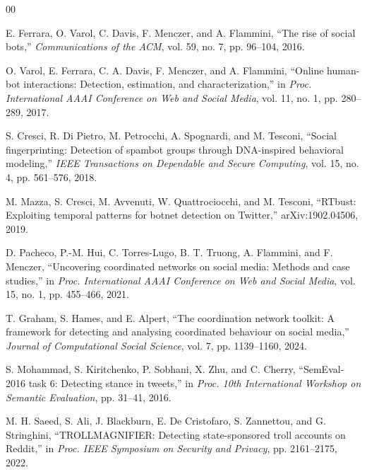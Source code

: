 \documentclass[conference]{IEEEtran}
\begin{document}
\begin{thebibliography}{00}

E. Ferrara, O. Varol, C. Davis, F. Menczer, and A. Flammini, ``The rise of
social bots,'' \emph{Communications of the ACM}, vol. 59, no. 7, pp. 96--104,
2016.

O. Varol, E. Ferrara, C. A. Davis, F. Menczer, and A. Flammini, ``Online
human-bot interactions: Detection, estimation, and characterization,'' in
\emph{Proc. International AAAI Conference on Web and Social Media}, vol. 11,
no. 1, pp. 280--289, 2017.

S. Cresci, R. Di Pietro, M. Petrocchi, A. Spognardi, and M. Tesconi, ``Social
fingerprinting: Detection of spambot groups through DNA-inspired behavioral
modeling,'' \emph{IEEE Transactions on Dependable and Secure Computing},
vol. 15, no. 4, pp. 561--576, 2018.

M. Mazza, S. Cresci, M. Avvenuti, W. Quattrociocchi, and M. Tesconi,
``RTbust: Exploiting temporal patterns for botnet detection on Twitter,''
arXiv:1902.04506, 2019.

D. Pacheco, P.-M. Hui, C. Torres-Lugo, B. T. Truong, A. Flammini, and
F. Menczer, ``Uncovering coordinated networks on social media: Methods and
case studies,'' in \emph{Proc. International AAAI Conference on Web and Social
Media}, vol. 15, no. 1, pp. 455--466, 2021.

T. Graham, S. Hames, and E. Alpert, ``The coordination network toolkit: A
framework for detecting and analysing coordinated behaviour on social media,''
\emph{Journal of Computational Social Science}, vol. 7, pp. 1139--1160, 2024.

S. Mohammad, S. Kiritchenko, P. Sobhani, X. Zhu, and C. Cherry,
``SemEval-2016 task 6: Detecting stance in tweets,'' in \emph{Proc. 10th
International Workshop on Semantic Evaluation}, pp. 31--41, 2016.

M. H. Saeed, S. Ali, J. Blackburn, E. De Cristofaro, S. Zannettou, and
G. Stringhini, ``TROLLMAGNIFIER: Detecting state-sponsored troll accounts on
Reddit,'' in \emph{Proc. IEEE Symposium on Security and Privacy}, pp.
2161--2175, 2022.

\end{thebibliography}
\end{document}
